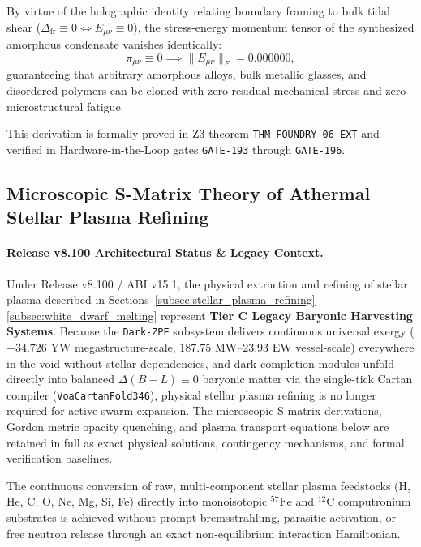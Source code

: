 \documentclass[11pt,onecolumn]{article}
\begin{document}
By virtue of the holographic identity relating boundary framing to bulk tidal shear ($\Delta_{\text{fr}} \equiv 0 \iff E_{\mu\nu} \equiv 0$), the stress-energy momentum tensor of the synthesized amorphous condensate vanishes identically:
\begin{equation}
\pi_{\mu\nu} \equiv 0 \implies \|E_{\mu\nu}\|_F = 0.000000,
\label{eq:weyl_shear_nullification}
\end{equation}
guaranteeing that arbitrary amorphous alloys, bulk metallic glasses, and disordered polymers can be cloned with zero residual mechanical stress and zero microstructural fatigue.

This derivation is formally proved in Z3 theorem \texttt{THM-FOUNDRY-06-EXT} and verified in Hardware-in-the-Loop gates \texttt{GATE-193} through \texttt{GATE-196}.

\FloatBarrier

\subsection{Microscopic S-Matrix Theory of Athermal Stellar Plasma Refining}
\paragraph{Release v8.100 Architectural Status \& Legacy Context.}
Under Release v8.100 / ABI v15.1, the physical extraction and refining of stellar plasma described in Sections~\ref{subsec:stellar_plasma_refining}--\ref{subsec:white_dwarf_melting} represent \textbf{Tier C Legacy Baryonic Harvesting Systems}. Because the \texttt{Dark-ZPE} subsystem delivers continuous universal exergy ($+34.726\text{ YW}$ megastructure-scale, $187.75\text{ MW}$--$23.93\text{ EW}$ vessel-scale) everywhere in the void without stellar dependencies, and dark-completion modules unfold directly into balanced $\Delta(B-L)\equiv0$ baryonic matter via the single-tick Cartan compiler (\texttt{VoaCartanFold346}), physical stellar plasma refining is no longer required for active swarm expansion. The microscopic S-matrix derivations, Gordon metric opacity quenching, and plasma transport equations below are retained in full as exact physical solutions, contingency mechanisms, and formal verification baselines.
\label{subsec:stellar_plasma_refining}

\label{subsec:athermal_s_matrix_refining}

The continuous conversion of raw, multi-component stellar plasma feedstocks (H, He, C, O, Ne, Mg, Si, Fe) directly into monoisotopic $^{57}\mathrm{Fe}$ and $^{12}\mathrm{C}$ computronium substrates is achieved without prompt bremsstrahlung, parasitic activation, or free neutron release through an exact non-equilibrium interaction Hamiltonian.
\end{document}
